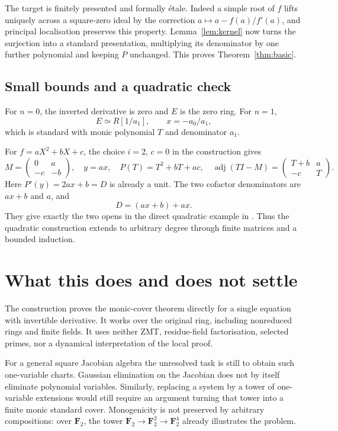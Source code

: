 \documentclass[11pt]{article}
\newcommand{\adj}{\operatorname{adj}}
\begin{document}
The target is finitely presented and formally \'etale. Indeed a simple
root of $f$ lifts uniquely across a square-zero ideal by the correction
$a\mapsto a-f(a)/f'(a)$, and principal localisation preserves this
property. Lemma~\ref{lem:kernel} now turns the surjection into a
standard presentation, multiplying its denominator by one further
polynomial and keeping $P$ unchanged. This proves
Theorem~\ref{thm:basic}.

\subsection{Small bounds and a quadratic check}

For $n=0$, the inverted derivative is zero and $E$ is the zero ring.
For $n=1$,
\[
              E\simeq R[1/a_1],\qquad x=-a_0/a_1,
\]
which is standard with monic polynomial $T$ and denominator $a_1$.

For $f=aX^2+bX+c$, the choice $i=2$, $c=0$ in the construction gives
\[
 M=\begin{pmatrix}0&a\\-c&-b\end{pmatrix},\quad y=ax,
 \quad P(T)=T^2+bT+ac,
 \quad \adj(TI-M)=\begin{pmatrix}T+b&a\\-c&T\end{pmatrix}.
\]
Here $P'(y)=2ax+b=D$ is already a unit. The two cofactor denominators
are $ax+b$ and $a$, and
\[
                    D=(ax+b)+ax.
\]
They give exactly the two opens in the direct quadratic example in
. Thus the quadratic construction extends to
arbitrary degree through finite matrices and a bounded induction.

\section{What this does and does not settle}

The construction proves the monic-cover theorem directly for a single
equation with invertible derivative. It works over the original ring,
including nonreduced rings and finite fields. It uses neither ZMT,
residue-field factorisation, selected primes, nor a dynamical
interpretation of the local proof.

For a general square Jacobian algebra the unresolved task is still to
obtain such one-variable charts. Gaussian elimination on the Jacobian
does not by itself eliminate polynomial variables. Similarly, replacing
a system by a tower of one-variable extensions would still require
an argument turning that tower into a finite monic standard cover.
Monogenicity is not preserved by arbitrary compositions: over
$\mathbf F_2$, the tower $\mathbf F_2\to\mathbf F_2^2\to\mathbf F_2^4$
already illustrates the problem.
\end{document}
